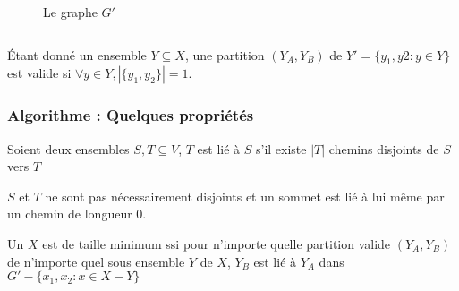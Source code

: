 \documentclass[9pt]{beamer}
\begin{document}
\begin{frame}
\begin{columns}
\begin{column}{0.40\linewidth}
\begin{figure}
\begin{center}
                \end{center}
                \caption{Le graphe $G'$}
            \end{figure}
        \end{column}
    \end{columns}

    \pause
    \vfill

    \begin{df}
        Étant donné un ensemble $Y \subseteq X$, une partition $(Y_A, Y_B)$ de $Y' = \{y_1, y2 : y
        \in Y \}$ est valide si $\forall y \in Y, |\{y_1, y_2\}| = 1$.
    \end{df}
\end{frame}
\begin{frame}
    \frametitle{Algorithme : Quelques propriétés}

    \begin{rappel}
        Soient deux ensembles $S, T \subseteq V$, $T$ est lié à $S$ s'il existe $|T|$ chemins
        disjoints de $S$ vers $T$
    \end{rappel}

    \pause
    \vfill

    \begin{rmq}
        $S$ et $T$ ne sont pas nécessairement disjoints et un sommet est lié à lui même par un
        chemin de longueur $0$.
    \end{rmq}

    \pause
    \vfill

    \begin{thrm}
        Un \oct $X$ est de taille minimum ssi pour n'importe quelle partition valide $(Y_A, Y_B)$ de
        n'importe quel sous ensemble $Y$ de $X$, $Y_B$ est lié à $Y_A$ dans $G' - \{x_1, x_2 : x \in
        X - Y \}$
    \end{thrm}
\end{frame}
\end{document}
